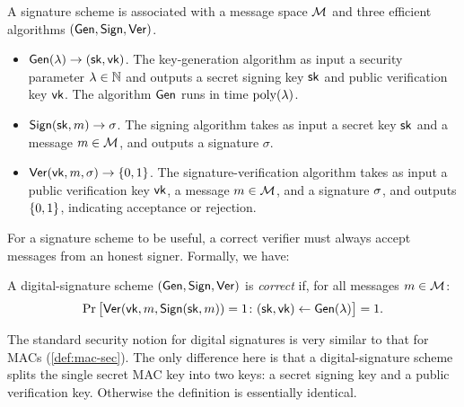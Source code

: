 \begin{definition}
	A signature scheme is associated with a message space $\mathcal{M}$ and three efficient algorithms $(\mathsf{Gen}, \mathsf{Sign}, \mathsf{Ver})$.

	\begin{itemize}
    \item $\mathsf{Gen}(\lambda) \to ({\mathsf{sk}}, \mathsf{vk})$.
      The key-generation algorithm as input a security parameter $\lambda \in \mathbb{N}$ and outputs a secret signing key ${\mathsf{sk}}$ and public verification key $\mathsf{vk}$.
      The algorithm $\mathsf{Gen}$ runs in time $\operatorname{poly}(\lambda)$.
    \item $\mathsf{Sign}({\mathsf{sk}}, m) \to \sigma$.
      The signing algorithm takes as input a secret key ${\mathsf{sk}}$ and a message $m \in \mathcal{M}$, and outputs a signature $\sigma$.
    \item $\mathsf{Ver}(\mathsf{vk}, m, \sigma) \to \{0,1\}$.
      The signature-verification algorithm takes as input a public verification key $\mathsf{vk}$, a message $m \in \mathcal{M}$, and a signature $\sigma$, 
      and outputs $\{0,1\}$, indicating acceptance or rejection.
	\end{itemize}
	
\end{definition}

For a signature scheme to be useful, a correct verifier must always accept messages from an
honest signer. Formally, we have:

\begin{definition}
  A digital-signature scheme $(\mathsf{Gen}, \mathsf{Sign}, \mathsf{Ver})$ is \emph{correct} if,
  for all messages $m \in \mathcal{M}$:
  \[ \Pr\big[\mathsf{Ver}(\mathsf{vk}, m, \mathsf{Sign}({\mathsf{sk}}, m)) = 1 \colon ({\mathsf{sk}}, \mathsf{vk}) \gets \mathsf{Gen}(\lambda) \big] = 1. \]
\end{definition}

The standard security notion for digital signatures is very similar
to that for MACs (\cref{def:mac-sec}).
The only difference here is that a digital-signature scheme splits the single
secret MAC key into two keys: a secret signing key and a public verification key.
Otherwise the definition is essentially identical.

